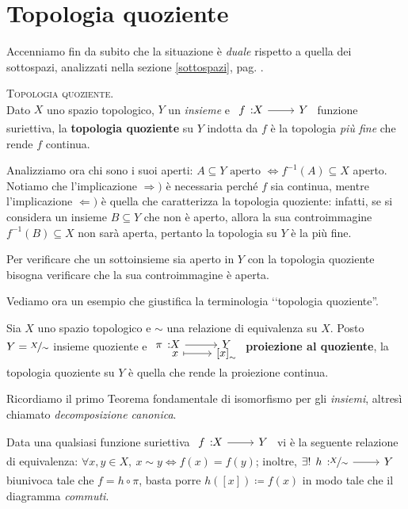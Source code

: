 \section{Topologia quoziente}
Accenniamo fin da subito che la situazione è \textit{duale} rispetto a quella dei sottospazi, analizzati nella sezione \ref{sottospazi}, pag. \pageref{sottospazi}.
\begin{define}\textsc{Topologia quoziente.}\\
	Dato $X$ uno spazio topologico, $Y$ un \textit{insieme} e $\funz f X Y$ funzione suriettiva, la \textbf{topologia quoziente} su $Y$ indotta da $f$ è la topologia \textit{più fine} che rende $f$ continua.
\end{define}
Analizziamo ora chi sono i suoi aperti: $\displaystyle A\subseteq Y \text{ aperto } \iff f^{-1}(A)\subseteq X$ aperto. Notiamo che l'implicazione $\Rightarrow)$ è necessaria perché $f$ sia continua, mentre l'implicazione $\Leftarrow)$ è quella che caratterizza la topologia quoziente: infatti, se si considera un insieme $B\subseteq Y$ che non è aperto, allora la sua controimmagine $f^{-1}(B)\subseteq X$ non sarà aperta, pertanto la topologia su $Y$ è la più fine.
\begin{tips}
	Per verificare che un sottoinsieme sia aperto in $Y$ con la topologia quoziente bisogna verificare che la sua controimmagine è aperta.
\end{tips}
Vediamo ora un esempio che giustifica la terminologia ‘‘topologia quoziente''.
\begin{example}
	Sia $X$ uno spazio topologico e $\sim$ una relazione di equivalenza su $X$. Posto $Y=\nicefrac{X}{\sim}$ insieme quoziente e $\funztot \pi X Y x {\left[x\right]_\sim}$ \textbf{proiezione al quoziente}, la topologia quoziente su $Y$ è quella che rende la proiezione continua.
\end{example}
Ricordiamo il primo Teorema fondamentale di isomorfismo per gli \textit{insiemi}, altresì chiamato \textit{decomposizione canonica}.
\begin{remember}
	\begin{minipage}[t]{0.83\textwidth}
		Data una qualsiasi funzione suriettiva $\funz f X Y$ vi è la seguente relazione di equivalenza: $\displaystyle \forall x,y\in X, \ x\sim y \iff f(x)=f(y)$; inoltre, $\exists ! \funz h {\nicefrac{X}{\sim}} Y$ biunivoca tale che $f=h\circ\pi$, basta porre $h\left( [x] \right) \coloneqq f(x)$ in modo tale che il diagramma \textit{commuti}.
	\end{minipage}
	\begin{minipage}[t]{0.13\textwidth}\vspace{-10pt}
	\end{minipage}
\end{remember}
